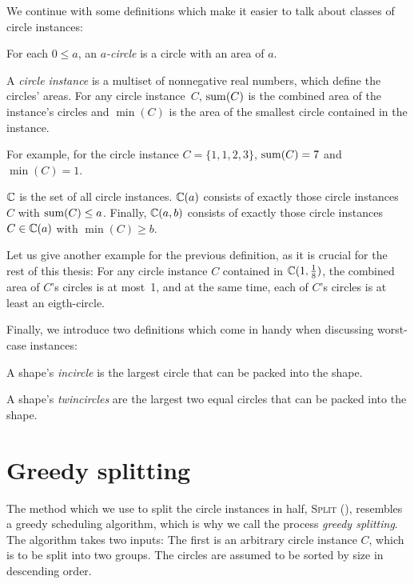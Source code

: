 \documentclass[a4paper,style=print,bibliography=totoc,nexus,lnum,extramargin]{tubsbook}
\begin{document}
We continue with some definitions which make it easier to talk about classes of circle instances:

\begin{definition}
    For each $0 \le a$, an \emph{$a$-circle} is a circle with an area of $a$.
\end{definition}

\begin{definition}\label{def:circle-instance}
    A \emph{circle instance} is a multiset of nonnegative real numbers, which define the circles' areas.
    For any circle instance~$C$, $\operatorname{sum}(C)$ is the combined area of the instance's circles and $\min(C)$ is the area of the smallest circle contained in the instance.
\end{definition}

For example, for the circle instance $C = \{1,1,2,3\}$, $\operatorname{sum}(C) = 7$ and $\min(C) = 1$.

\begin{definition}
    $\mathbb{C}$ is the set of all circle instances. $\mathbb{C}(a)$ consists of exactly those circle instances $C$ with $\operatorname{sum}(C) \le a$. Finally, $\mathbb{C}(a,b)$ consists of exactly those circle instances $C \in \mathbb{C}(a)$ with $\min(C) \ge b$.
\end{definition}

Let us give another example for the previous definition, as it is crucial for the rest of this thesis: For any circle instance $C$ contained in $\mathbb{C}(1,\frac{1}{8})$, the combined area of $C$'s circles is at most~1, and at the same time, each of $C$'s circles is at least an eigth-circle.

Finally, we introduce two definitions which come in handy when discussing worst-case instances:

\begin{definition}
    A shape's \emph{incircle} is the largest circle that can be packed into the shape.
\end{definition}

\begin{definition}
    A shape's \emph{twincircles} are the largest two equal circles that can be packed into the shape.
\end{definition}

\pagebreak

\section{Greedy splitting}

The method which we use to split the circle instances in half, \textsc{Split} (), resembles a greedy scheduling algorithm, which is why we call the process \emph{greedy splitting}. The algorithm takes two inputs: The first is an arbitrary circle instance $C$, which is to be split into two groups. The circles are assumed to be sorted by size in descending order.
\end{document}
